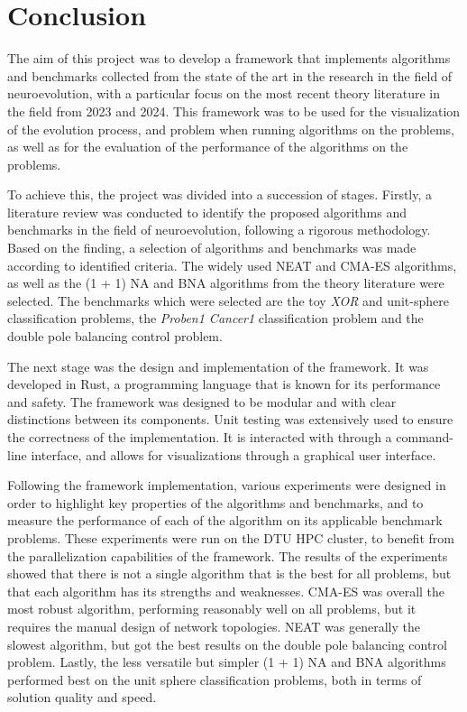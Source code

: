 \chapter{Conclusion}
\label{chap:conclusion}

The aim of this project was to develop a framework that implements algorithms and benchmarks collected from the state of the art in the research in the field of neuroevolution, with a particular
focus on the most recent theory literature in the field from 2023 and 2024. This framework was to be used for the visualization of the evolution process, and problem when running algorithms on
the problems, as well as for the evaluation of the performance of the algorithms on the problems.

To achieve this, the project was divided into a succession of stages. Firstly, a literature review was conducted to identify the proposed algorithms and benchmarks in the field of neuroevolution,
following a rigorous methodology.
Based on the finding, a selection of algorithms and benchmarks was made according to identified criteria. The widely used NEAT and CMA-ES algorithms, as well as the (1 + 1) NA and BNA
algorithms from the theory literature were selected. The benchmarks which were selected are the toy \textit{XOR} and unit-sphere classification problems, the \textit{Proben1 Cancer1}
classification problem and the double pole balancing control problem.

The next stage was the design and implementation of the framework. It was developed in Rust, a programming language that is known for its performance and safety. The framework was designed
to be modular and with clear distinctions between its components. Unit testing was extensively used to ensure the correctness of the implementation. It is interacted with through a command-line
interface, and allows for visualizations through a graphical user interface.

Following the framework implementation, various experiments were designed in order to highlight key properties of the algorithms and benchmarks, and to measure the performance of each of
the algorithm on its applicable benchmark problems. These experiments were run on the DTU HPC cluster, to benefit from the parallelization capabilities of the framework.
The results of the experiments showed that there is not a single algorithm that is the best for all problems, but that each algorithm has its strengths and weaknesses. CMA-ES was overall
the most robust algorithm, performing reasonably well on all problems, but it requires the manual design of network topologies. NEAT was generally the slowest algorithm, but got the best results on
the double pole balancing control problem. Lastly, the less versatile but simpler (1 + 1) NA and BNA algorithms performed best on the unit sphere classification problems, both in terms of
solution quality and speed.

